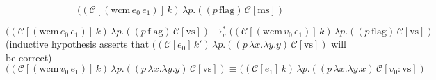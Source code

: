 \documentclass[ms,electronic,twosidetoc,letterpaper,chaptercenter,parttop]{byumsphd}
\begin{document}
\[
((\mathcal{C}[(\mathrm{wcm}\,e_0\,e_1)]\,k)\,\lambda p.((p\,\mathrm{flag})\,\mathcal{C}[\mathrm{ms}])
\]

\[
((\mathcal{C}[(\mathrm{wcm}\,e_0\,e_1)]\,k)\,\lambda p.((p\,\mathrm{flag})\,\mathcal{C}[\mathrm{vs}])\rightarrow_{v}^{*}((\mathcal{C}[(\mathrm{wcm}\,v_0\,e_1)]\,k)\,\lambda p.((p\,\mathrm{flag})\,\mathcal{C}[\mathrm{vs}])
\]
(inductive hypothesis asserts that $((\mathcal{C}[e_0]\,k')\,\lambda p.((p\,\lambda x.\lambda y.y)\,\mathcal{C}[\mathrm{vs}])$ will be correct)
\[
((\mathcal{C}[(\mathrm{wcm}\,v_0\,e_1)]\,k)\,\lambda p.((p\,\lambda x.\lambda y.y)\,\mathcal{C}[\mathrm{vs}])\equiv((\mathcal{C}[e_1]\,k)\,\lambda p.((p\,\lambda x.\lambda y.x)\,\mathcal{C}[v_0 : \mathrm{vs}])
\]











\end{document}
